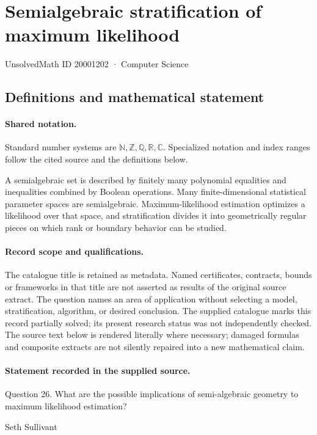 \documentclass[11pt]{article}
\begin{document}
\setcounter{section}{20001201}
\section{Semialgebraic stratification of maximum likelihood}\label{20001202}
{\small\sffamily UnsolvedMath ID 20001202 · Computer Science}
\subsection{Definitions and mathematical statement}

\paragraph{Shared notation.}Standard number systems are $\mathbb N,\mathbb Z,\mathbb Q,\mathbb R,\mathbb C$. Specialized notation and index ranges follow the cited source and the definitions below.


A semialgebraic set is described by finitely many polynomial equalities and inequalities combined by Boolean operations. Many finite-dimensional statistical parameter spaces are semialgebraic. Maximum-likelihood estimation optimizes a likelihood over that space, and stratification divides it into geometrically regular pieces on which rank or boundary behavior can be studied.
\paragraph{Record scope and qualifications.}
The catalogue title is retained as metadata. Named certificates, contracts, bounds or frameworks in that title are not asserted as results of the original source extract.
The question names an area of application without selecting a model, stratification, algorithm, or desired conclusion. The supplied catalogue marks this record partially solved; its present research status was not independently checked.
The source text below is rendered literally where necessary; damaged formulas and composite extracts are not silently repaired into a new mathematical claim.
\paragraph{Statement recorded in the supplied source.}
Question 26. What are the possible implications of semi-algebraic geometry to maximum likelihood estimation?

Seth Sullivant
\end{document}

